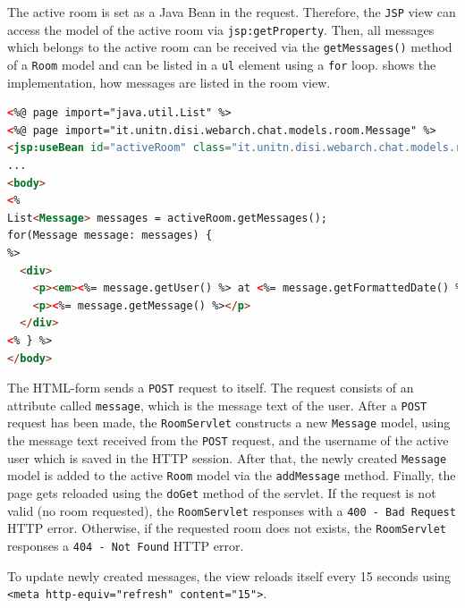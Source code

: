 The active room is set as a Java Bean in the request. Therefore, the \texttt{JSP} view can access the model of the active room via \texttt{jsp:getProperty}. Then, all messages which belongs to the active room can be received via the \texttt{getMessages()} method of a \texttt{Room} model and can be listed in a \texttt{ul} element using a \texttt{for} loop.  shows the implementation, how messages are listed in the room view.
\begin{lstlisting}[label=lst:03_impl_servlets_room_bean, caption=List messages for a specific room, language=html]
<%@ page import="java.util.List" %>
<%@ page import="it.unitn.disi.webarch.chat.models.room.Message" %>
<jsp:useBean id="activeRoom" class="it.unitn.disi.webarch.chat.models.room.Room" scope="request" />
...
<body>
<%
List<Message> messages = activeRoom.getMessages();
for(Message message: messages) {
%>
  <div>
    <p><em><%= message.getUser() %> at <%= message.getFormattedDate() %>:</em></p>
    <p><%= message.getMessage() %></p>
  </div>
<% } %>
</body>
\end{lstlisting}

The HTML-form sends a \texttt{POST} request to itself. The request consists of an attribute called \texttt{message}, which is the message text of the user. After a \texttt{POST} request has been made, the \texttt{RoomServlet} constructs a new \texttt{Message} model, using the message text received from the \texttt{POST} request, and the username of the active user which is saved in the HTTP session. After that, the newly created \texttt{Message} model is added to the active \texttt{Room} model via the \texttt{addMessage} method. Finally, the page gets reloaded using the \texttt{doGet} method of the servlet. If the request is not valid (no room requested), the \texttt{RoomServlet} responses with a \texttt{400 - Bad Request} HTTP error. Otherwise, if the requested room does not exists, the \texttt{RoomServlet} responses a \texttt{404 - Not Found} HTTP error.

To update newly created messages, the view reloads itself every 15 seconds using \texttt{<meta http-equiv="refresh" content="15">}.


